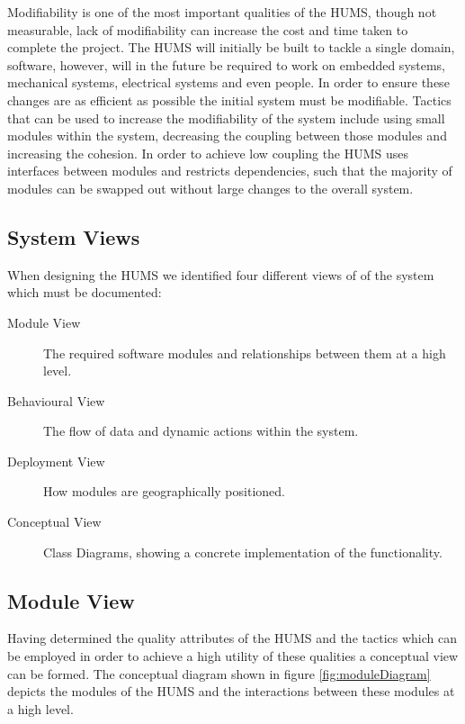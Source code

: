 \documentclass[10pt,a4paper]{article}
\begin{document}
Modifiability is one of the most important qualities of the HUMS, though not measurable, lack of modifiability can increase the cost and time taken to complete the project. The HUMS will initially be built to tackle a single domain, software, however, will in the future be required to work on embedded systems, mechanical systems, electrical systems and even people. In order to ensure these changes are as efficient as possible the initial system 
must be modifiable. Tactics that can be used to increase the modifiability of the system include using small modules within the system, decreasing the coupling between those modules and increasing the cohesion. In order to achieve low coupling  the HUMS uses interfaces between modules and restricts dependencies, such that the majority of modules can be swapped out without large changes to the overall system.

\subsection{System Views}
When designing the HUMS we identified four different views of of the system which must be documented:
\begin{description}
\item[Module View] The required software modules and relationships between them at a high level.
\item[Behavioural View] The flow of data and dynamic actions within the system.
\item[Deployment View] How modules are geographically positioned.
\item[Conceptual View] Class Diagrams, showing a concrete implementation of the functionality.
\end{description}

\subsection{Module View}
Having determined the quality attributes of the HUMS and the tactics which can be employed in order to achieve a high utility of these qualities a conceptual view can be formed. The conceptual diagram shown in figure \ref{fig:moduleDiagram} depicts the modules of the HUMS and the interactions between these modules at a high level.
\end{document}
